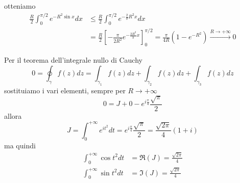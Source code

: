 \begin{itemize}
\begin{figure}[htpb]
\end{figure}
\FloatBarrier


otteniamo
\begin{align*}
\frac{R}{2}\int\nolimits^{\pi /2}_{0} e^{- R^{2}\sin x} dx & \leq \frac{R}{2}\int\nolimits^{\pi /2}_{0} e^{- \frac{2}{\pi} R^{2} x} dx\\
 & = \frac{R}{2}\left[ - \frac{\pi}{2R^{2}} e^{- \frac{2R^{2}}{\pi} x}\right]^{\pi /2}_{0} = \frac{\pi}{4R}\left(1 - e^{- R^{2}}\right)\xrightarrow{R\rightarrow + \infty} 0
\end{align*}
\end{itemize}

Per il teorema dell'integrale nullo di Cauchy
\begin{equation*}
0 = \oint\nolimits_{\gamma} f(z) dz = \int\nolimits_{\gamma_{1}} f(z) dz + \int\nolimits_{\gamma_{2}} f(z) dz + \int\nolimits_{\gamma_{3}} f(z) dz
\end{equation*}
sostituiamo i vari elementi, sempre per $R\rightarrow + \infty $
\begin{equation*}
0 = J + 0 - e^{i\frac{\pi}{4}}\frac{\sqrt{\pi}}{2}
\end{equation*}
allora
\begin{equation*}
J = \int\nolimits^{+ \infty}_{0} e^{it^{2}} dt = e^{i\frac{\pi}{4}}\frac{\sqrt{\pi}}{2} = \frac{\sqrt{2\pi}}{4}\left(1 + i\right)
\end{equation*}
ma quindi
\begin{align*}
\int\nolimits^{+ \infty}_{0}\cos t^{2} dt & = \Re (J) = \frac{\sqrt{2\pi}}{4}\\
\int\nolimits^{+ \infty}_{0}\sin t^{2} dt & = \Im (J) = \frac{\sqrt{2\pi}}{4}
\end{align*}

\Soluzione

